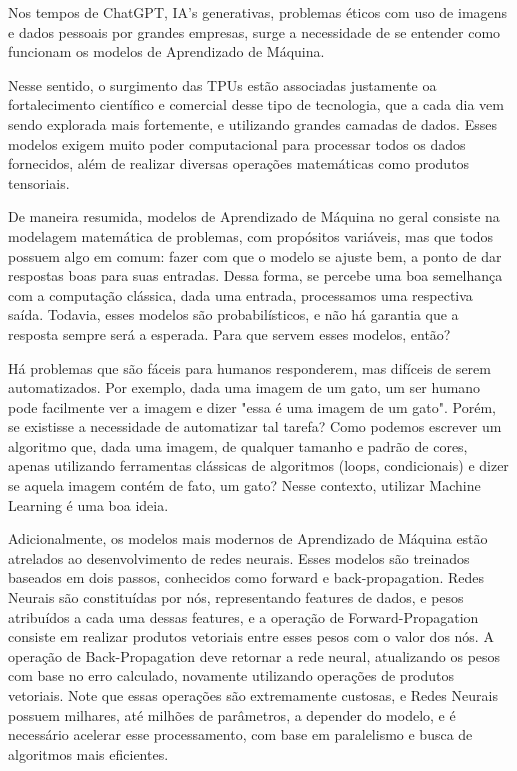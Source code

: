 \documentclass{report}
\begin{document}
Nos tempos de ChatGPT, IA's generativas, problemas éticos com uso de imagens e dados pessoais por grandes empresas, surge a necessidade de se entender como funcionam os modelos de Aprendizado de Máquina. 

Nesse sentido, o surgimento das TPUs estão associadas justamente oa fortalecimento científico e comercial desse tipo de tecnologia, que a cada dia vem sendo explorada mais fortemente, e utilizando grandes camadas de dados. Esses modelos exigem muito poder computacional para processar todos os dados fornecidos, além de realizar diversas operações matemáticas como produtos tensoriais. 

De maneira resumida, modelos de Aprendizado de Máquina no geral consiste na modelagem matemática de problemas, com propósitos variáveis, mas que todos possuem algo em comum: fazer com que o modelo se ajuste bem, a ponto de dar respostas boas para suas entradas. Dessa forma, se percebe uma boa semelhança com a computação clássica, dada uma entrada, processamos uma respectiva saída. Todavia, esses modelos são probabilísticos, e não há garantia que a resposta sempre será a esperada. Para que servem esses modelos, então?

Há problemas que são fáceis para humanos responderem, mas difíceis de serem automatizados. Por exemplo, dada uma imagem de um gato, um ser humano pode facilmente ver a imagem e dizer "essa é uma imagem de um gato". Porém, se existisse a necessidade de automatizar tal tarefa? Como podemos escrever um algoritmo que, dada uma imagem, de qualquer tamanho e padrão de cores, apenas utilizando ferramentas clássicas de algoritmos (loops, condicionais) e dizer se aquela imagem contém de fato, um gato? Nesse contexto, utilizar Machine Learning é uma boa ideia.

Adicionalmente, os modelos mais modernos de Aprendizado de Máquina estão atrelados ao desenvolvimento de redes neurais. Esses modelos são treinados baseados em dois passos, conhecidos como forward e back-propagation. Redes Neurais são constituídas por nós, representando features de dados, e pesos atribuídos a cada uma dessas features, e a operação de Forward-Propagation consiste em realizar produtos vetoriais entre esses pesos com o valor dos nós. A operação de Back-Propagation deve retornar a rede neural, atualizando os pesos com base no erro calculado, novamente utilizando operações de produtos vetoriais. Note que essas operações são extremamente custosas, e Redes Neurais possuem milhares, até milhões de parâmetros, a depender do modelo, e é necessário acelerar esse processamento, com base em paralelismo e busca de algoritmos mais eficientes.
\end{document}
